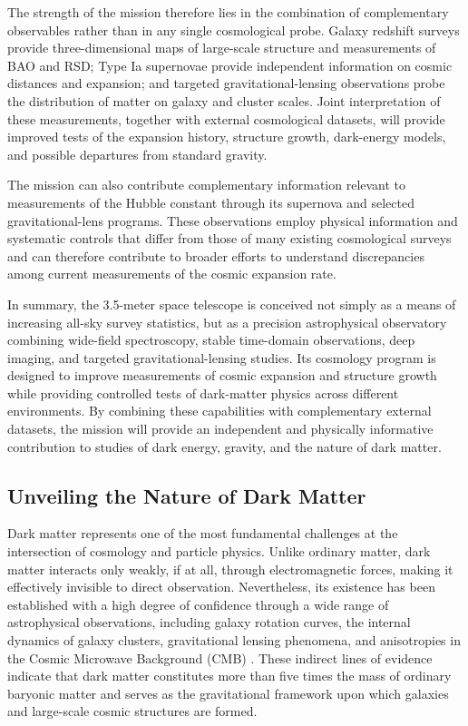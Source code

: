 The strength of the mission therefore lies in the combination of complementary observables rather than in any single cosmological probe. Galaxy redshift surveys provide three-dimensional maps of large-scale structure and measurements of BAO and RSD; Type Ia supernovae provide independent information on cosmic distances and expansion; and targeted gravitational-lensing observations probe the distribution of matter on galaxy and cluster scales. Joint interpretation of these measurements, together with external cosmological datasets, will provide improved tests of the expansion history, structure growth, dark-energy models, and possible departures from standard gravity.

The mission can also contribute complementary information relevant to measurements of the Hubble constant through its supernova and selected gravitational-lens programs. These observations employ physical information and systematic controls that differ from those of many existing cosmological surveys and can therefore contribute to broader efforts to understand discrepancies among current measurements of the cosmic expansion rate.

In summary, the 3.5-meter space telescope is conceived not simply as a means of increasing all-sky survey statistics, but as a precision astrophysical observatory combining wide-field spectroscopy, stable time-domain observations, deep imaging, and targeted gravitational-lensing studies. Its cosmology program is designed to improve measurements of cosmic expansion and structure growth while providing controlled tests of dark-matter physics across different environments. By combining these capabilities with complementary external datasets, the mission will provide an independent and physically informative contribution to studies of dark energy, gravity, and the nature of dark matter.

\subsection{Unveiling the Nature of Dark Matter}\label{unveiling-the-nature-of-dark-matter}

Dark matter represents one of the most fundamental challenges at the intersection of cosmology and particle physics. Unlike ordinary matter, dark matter interacts only weakly, if at all, through electromagnetic forces, making it effectively invisible to direct observation. Nevertheless, its existence has been established with a high degree of confidence through a wide range of astrophysical observations, including galaxy rotation curves, the internal dynamics of galaxy clusters, gravitational lensing phenomena, and anisotropies in the Cosmic Microwave Background (CMB) \cite{roos2010}. These indirect lines of evidence indicate that dark matter constitutes more than five times the mass of ordinary baryonic matter and serves as the gravitational framework upon which galaxies and large-scale cosmic structures are formed.

